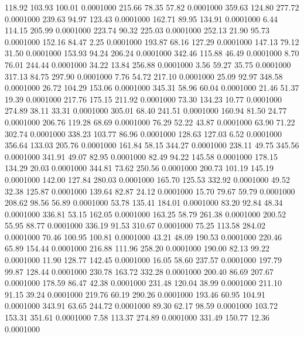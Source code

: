  118.92  103.93  100.01   0.0001000
 215.66   78.35   57.82   0.0001000
 359.63  124.80  277.72   0.0001000
 239.63   94.97  123.43   0.0001000
 162.71   89.95  134.91   0.0001000
   6.44  114.15  205.99   0.0001000
 223.74   90.32  225.03   0.0001000
 252.13   21.90   95.73   0.0001000
 152.16   84.47    2.25   0.0001000
 193.87   68.16  127.29   0.0001000
 147.13   79.12   31.50   0.0001000
 153.93   94.24  206.24   0.0001000
 342.46  115.88   46.49   0.0001000
   8.70   76.01  244.44   0.0001000
  34.22   13.84  256.88   0.0001000
   3.56   59.27   35.75   0.0001000
 317.13   84.75  297.90   0.0001000
   7.76   54.72  217.10   0.0001000
  25.09   92.97  348.58   0.0001000
  26.72  104.29  153.06   0.0001000
 345.31   58.96   60.04   0.0001000
  21.46   51.37   19.39   0.0001000
 217.76  175.15  211.92   0.0001000
  73.30  134.23   10.77   0.0001000
 274.89   38.11   33.31   0.0001000
 305.01   68.40  241.51   0.0001000
 160.94   81.50   24.77   0.0001000
 206.76  119.28   68.69   0.0001000
  76.29   52.22   43.87   0.0001000
  63.90   71.22  302.74   0.0001000
 338.23  103.77   86.96   0.0001000
 128.63  127.03    6.52   0.0001000
 356.64  133.03  205.76   0.0001000
 161.84   58.15  344.27   0.0001000
 238.11   49.75  345.56   0.0001000
 341.91   49.07   82.95   0.0001000
  82.49   94.22  145.58   0.0001000
 178.15  134.29   20.03   0.0001000
 344.81   73.62  250.56   0.0001000
 200.73  101.19  145.19   0.0001000
 142.00  127.84  280.03   0.0001000
 165.70  125.53  332.92   0.0001000
  49.52   32.38  125.87   0.0001000
 139.64   82.87   24.12   0.0001000
  15.70   79.67   59.79   0.0001000
 208.62   98.56   56.89   0.0001000
  53.78  135.41  184.01   0.0001000
  83.20   92.84   48.34   0.0001000
 336.81   53.15  162.05   0.0001000
 163.25   58.79  261.38   0.0001000
 200.52   55.95   88.77   0.0001000
 336.19   91.53  310.67   0.0001000
  75.25  113.58  284.02   0.0001000
  70.46  100.95  100.81   0.0001000
  43.21   48.09  190.53   0.0001000
 220.46   65.89  154.44   0.0001000
 216.88  111.96  258.20   0.0001000
 190.00   82.13   99.22   0.0001000
  11.90  128.77  142.45   0.0001000
  16.05   58.60  237.57   0.0001000
 197.79   99.87  128.44   0.0001000
 230.78  163.72  332.28   0.0001000
 200.40   86.69  207.67   0.0001000
 178.59   86.47   42.38   0.0001000
 231.48  120.04   38.99   0.0001000
 211.10   91.15   39.24   0.0001000
 219.76   60.19  290.26   0.0001000
 193.46   60.95  104.91   0.0001000
 343.91   63.65  244.72   0.0001000
  89.30   62.17   98.59   0.0001000
 103.72  153.31  351.61   0.0001000
   7.58  113.37  274.89   0.0001000
 331.49  150.77   12.36   0.0001000
